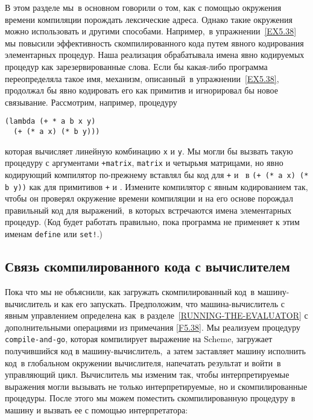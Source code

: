 \begin{exercise}{5.44}%
\label{EX5.44}%
%
%
В этом разделе мы~в основном говорили о том, как с
помощью окружения времени компиляции порождать лексические адреса.
Однако такие окружения можно использовать и другими способами.
Например,~в упражнении~\ref{EX5.38} мы повысили
эффективность скомпилированного кода путем явного кодирования
элементарных процедур.  Наша реализация обрабатывала имена явно
кодируемых процедур как
 зарезервированные слова.
Если бы какая-либо 
программа переопределяла такое имя, механизм, описанный~в 
упражнении~\ref{EX5.38},  продолжал бы явно кодировать его как
примитив и игнорировал бы новое связывание.  Рассмотрим, например,
процедуру

\begin{Verbatim}[fontsize=\small]
(lambda (+ * a b x y)
  (+ (* a x) (* b y)))
\end{Verbatim}
которая вычисляет линейную комбинацию {\tt x} и
{\tt y}.  Мы могли бы вызвать такую процедуру с аргументами
{\tt +matrix}, {\tt *matrix} и четырьмя матрицами, но
явно кодирующий компилятор по-прежнему вставлял бы код для
{\tt +} и {\tt *}~в {\tt (+ (* a x) (* b y))} как
для примитивов {\tt +} и {\tt *}.  Измените компилятор с
явным кодированием так, чтобы он проверял окружение времени компиляции
и на его основе порождал правильный код для выражений,~в которых
встречаются имена элементарных процедур.  (Код будет работать
правильно, пока программа не применяет к этим именам
{\tt define} или {\tt set!}.)
\end{exercise}

\subsection{Связь скомпилированного кода с вычислителем}
\label{INTERFACING-COMPILED-CODE-TO-THE-EVALUATOR}


Пока что мы не объяснили, как загружать скомпилированный
код~в ма\-ши\-ну-вычислитель и как его запускать. Предположим, что
машина-вычислитель с явным управлением определена как~в 
разделе~\ref{RUNNING-THE-EVALUATOR} с дополнительными операциями
из примечания \ref{F5.38}.  Мы реализуем процедуру
{\tt compile-and-go},
которая компилирует выражение на Scheme, загружает получившийся код в
машину-вычислитель,~а затем заставляет машину исполнить код~в глобальном
окружении вычислителя, напечатать результат и войти~в управляющий
цикл.  Вычислитель мы изменим так, чтобы интерпретируемые выражения
могли вызывать не только интерпретируемые, но и скомпилированные
процедуры. После этого мы можем поместить скомпилированную процедуру в
машину и вызвать ее с помощью интерпретатора:

